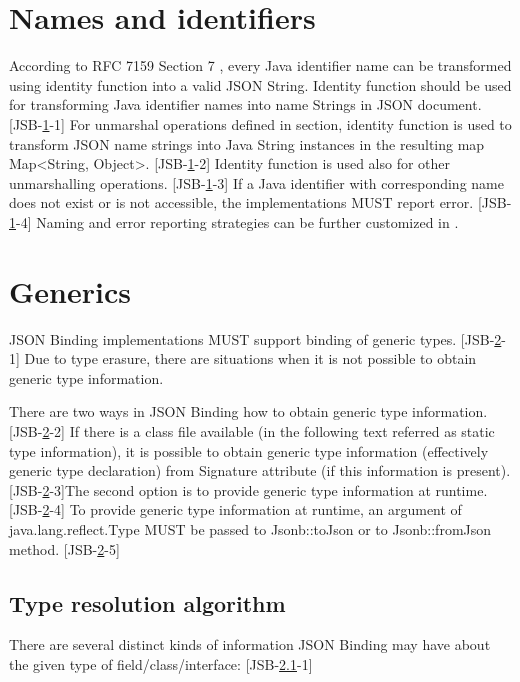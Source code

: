 \section{Names and identifiers}
\label{sec:naming}
According to RFC 7159 Section 7 \cite{rfc7159}, every Java identifier name can be transformed using identity function into a valid JSON String. Identity function should be used for transforming Java identifier names into name Strings in JSON document. [JSB-\ref{sec:naming}-1]
For unmarshal operations defined in  section, identity function is used to transform JSON name strings into Java String instances in the resulting map Map\textless String, Object\textgreater. [JSB-\ref{sec:naming}-2] Identity function is used also for other unmarshalling operations. [JSB-\ref{sec:naming}-3] If a Java identifier with corresponding name does not exist or is not accessible, the implementations MUST report error. [JSB-\ref{sec:naming}-4] Naming and error reporting strategies can be further customized in .

\section{Generics}
\label{sec:generics}
JSON Binding implementations MUST support binding of generic types. [JSB-\ref{sec:generics}-1] Due to type erasure, there are situations when it is not possible to obtain generic type information.

There are two ways in JSON Binding how to obtain generic type information. [JSB-\ref{sec:generics}-2] If there is a class file available (in the following text referred as static type information), it is possible to obtain generic type information (effectively generic type declaration) from Signature attribute (if this information is present). [JSB-\ref{sec:generics}-3]The second option is to provide generic type information at runtime. [JSB-\ref{sec:generics}-4] To provide generic type information at runtime, an argument of java.lang.reflect.Type MUST be passed to Jsonb::toJson or to Jsonb::fromJson method. [JSB-\ref{sec:generics}-5]

\subsection{Type resolution algorithm}
\label{sec:type_resolution_algorithm}
There are several distinct kinds of information JSON Binding may have about the given type of field/class/interface: [JSB-\ref{sec:type_resolution_algorithm}-1]

